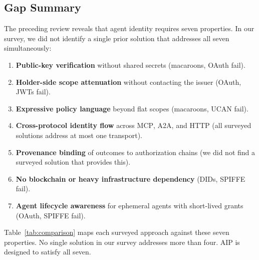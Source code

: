 \documentclass[11pt,a4paper]{article}
\newcommand{\aip}{\textsc{AIP}}
\newcommand{\atoa}{\textsc{A2A}}
\newcommand{\mcp}{\textsc{MCP}}
\begin{document}
\subsection{Gap Summary}
\label{sec:gap}

The preceding review reveals that agent identity requires seven properties. In our survey, we did not identify a single prior solution that addresses all seven simultaneously:

\begin{enumerate}[leftmargin=*,nosep]
  \item \textbf{Public-key verification} without shared secrets (macaroons, OAuth fail).
  \item \textbf{Holder-side scope attenuation} without contacting the issuer (OAuth, JWTs fail).
  \item \textbf{Expressive policy language} beyond flat scopes (macaroons, UCAN fail).
  \item \textbf{Cross-protocol identity flow} across \mcp{}, \atoa{}, and HTTP (all surveyed solutions address at most one transport).
  \item \textbf{Provenance binding} of outcomes to authorization chains (we did not find a surveyed solution that provides this).
  \item \textbf{No blockchain or heavy infrastructure dependency} (DIDs, SPIFFE fail).
  \item \textbf{Agent lifecycle awareness} for ephemeral agents with short-lived grants (OAuth, SPIFFE fail).
\end{enumerate}

Table~\ref{tab:comparison} maps each surveyed approach against these seven properties. No single solution in our survey addresses more than four. \aip{} is designed to satisfy all seven.
\end{document}
